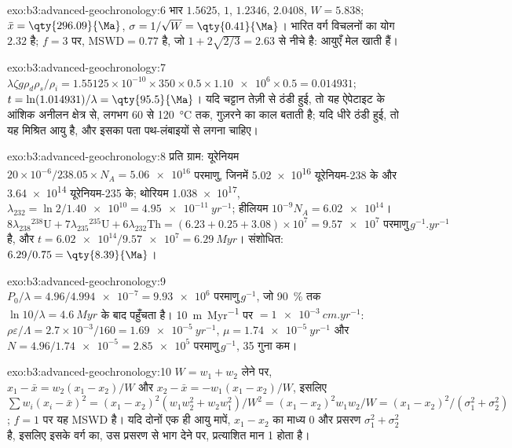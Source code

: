 \begin{solution}{exo:b3:advanced-geochronology:6}
भार $1.5625$, $1$, $1.2346$, $2.0408$, $W = 5.838$; $\bar x =
\qty{296.09}{\Ma}$, $\sigma = 1/\sqrt W = \qty{0.41}{\Ma}$। भारित
वर्ग विचलनों का योग $2.32$ है; $f = 3$ पर, $\mathrm{MSWD} = 0.77$ है, जो
$1 + 2\sqrt{2/3} = 2.63$ से नीचे है: आयुएँ मेल खाती हैं।
\end{solution}

\begin{solution}{exo:b3:advanced-geochronology:7}
$\lambda\zeta g\rho_d\rho_s/\rho_i = 1.55125\times10^{-10}\times350\times0.5
\times\num{1.10e6}\times0.5 = 0.014931$; $t = \ln(1.014931)/\lambda =
\qty{95.5}{\Ma}$। यदि चट्टान तेज़ी से ठंडी हुई, तो यह
ऐपेटाइट के आंशिक अनीलन क्षेत्र से, लगभग 60 से \qty{120}{\celsius} तक, गुज़रने का काल बताती है; यदि
धीरे ठंडी हुई, तो यह मिश्रित आयु है, और इसका पता पथ-लंबाइयों से लगना चाहिए।
\end{solution}

\begin{solution}{exo:b3:advanced-geochronology:8}
प्रति ग्राम: यूरेनियम $20\times10^{-6}/238.05\times N_A = \num{5.06e16}$ परमाणु, जिनमें
\num{5.02e16} यूरेनियम-238 के और \num{3.64e14} यूरेनियम-235 के; थोरियम
\num{1.038e17}, $\lambda_{232} = \ln 2/\num{1.40e10} = \qty{4.95e-11}{yr^{-1}}$;
हीलियम $10^{-9}N_A = \num{6.02e14}$। 
$8\lambda_{238}{}^{238}\mathrm U + 7\lambda_{235}{}^{235}\mathrm U +
6\lambda_{232}\mathrm{Th} = (6.23 + 0.25 + 3.08)\times10^7 =
\num{9.57e7}\text{ परमाणु}\,\unit{g^{-1}.yr^{-1}}$ है, और $t = \num{6.02e14}/\num{9.57e7} =
\qty{6.29}{Myr}$। संशोधित: $6.29/0.75 = \qty{8.39}{\Ma}$।
\end{solution}

\begin{solution}{exo:b3:advanced-geochronology:9}
$P_0/\lambda = 4.96/\num{4.994e-7} = \num{9.93e6}\text{ परमाणु}\,\unit{g^{-1}}$, जो
\qty{90}{\percent} तक $\ln 10/\lambda = \qty{4.6}{Myr}$ के बाद पहुँचता है।
\qty{10}{m.Myr^{-1}} पर $= \qty{1e-3}{cm.yr^{-1}}$: $\rho\varepsilon/\Lambda =
2.7\times10^{-3}/160 = \qty{1.69e-5}{yr^{-1}}$, $\mu = \qty{1.74e-5}{yr^{-1}}$
और $N = 4.96/\num{1.74e-5} = \num{2.85e5}\text{ परमाणु}\,\unit{g^{-1}}$, 35 गुना कम।
\end{solution}

\begin{solution}{exo:b3:advanced-geochronology:10}
$W = w_1 + w_2$ लेने पर, $x_1 - \bar x = w_2(x_1 - x_2)/W$ और $x_2 - \bar x =
-w_1(x_1 - x_2)/W$, इसलिए $\sum w_i(x_i - \bar x)^2 = (x_1 - x_2)^2(w_1w_2^2 +
w_2w_1^2)/W^2 = (x_1 - x_2)^2w_1w_2/W = (x_1 - x_2)^2/(\sigma_1^2 +
\sigma_2^2)$; $f = 1$ पर यह MSWD है। यदि दोनों एक ही आयु मापें,
$x_1 - x_2$ का माध्य 0 और प्रसरण $\sigma_1^2 + \sigma_2^2$ है, इसलिए
इसके वर्ग का, उस प्रसरण से भाग देने पर, प्रत्याशित मान 1 होता है।
\end{solution}

